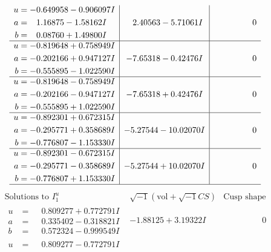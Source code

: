 \documentclass[1p]{elsarticle_modified}
\theoremstyle{definition}
\newcommand{\I}{\sqrt{-1}}
\begin{document}
$$\begin{array}{c|c|c}
\begin{aligned}
u &= -0.649958 - 0.906097 I \\
a &= \phantom{-}1.16875 - 1.58162 I \\
b &= \phantom{-}0.08760 + 1.49800 I\end{aligned}
 & \phantom{-}2.40563 - 5.71061 I & \phantom{-0.000000 } 0 \\ \hline\begin{aligned}
u &= -0.819648 + 0.758949 I \\
a &= -0.202166 + 0.947127 I \\
b &= -0.555895 - 1.022590 I\end{aligned}
 & -7.65318 - 0.42476 I & \phantom{-0.000000 } 0 \\ \hline\begin{aligned}
u &= -0.819648 - 0.758949 I \\
a &= -0.202166 - 0.947127 I \\
b &= -0.555895 + 1.022590 I\end{aligned}
 & -7.65318 + 0.42476 I & \phantom{-0.000000 } 0 \\ \hline\begin{aligned}
u &= -0.892301 + 0.672315 I \\
a &= -0.295771 + 0.358689 I \\
b &= -0.776807 - 1.153330 I\end{aligned}
 & -5.27544 - 10.02070 I & \phantom{-0.000000 } 0 \\ \hline\begin{aligned}
u &= -0.892301 - 0.672315 I \\
a &= -0.295771 - 0.358689 I \\
b &= -0.776807 + 1.153330 I\end{aligned}
 & -5.27544 + 10.02070 I & \phantom{-0.000000 } 0\\
 \hline 
 \end{array}$$\newpage$$\begin{array}{c|c|c}  
\text{Solutions to }I^u_{1}& \I (\text{vol} + \sqrt{-1}CS) & \text{Cusp shape}\\
 \hline 
\begin{aligned}
u &= \phantom{-}0.809277 + 0.772791 I \\
a &= \phantom{-}0.335402 - 0.318821 I \\
b &= \phantom{-}0.572324 - 0.999549 I\end{aligned}
 & -1.88125 + 3.19322 I & \phantom{-0.000000 } 0 \\ \hline\begin{aligned}
u &= \phantom{-}0.809277 - 0.772791 I \\

\end{aligned}
\end{array}$$
\end{document}

